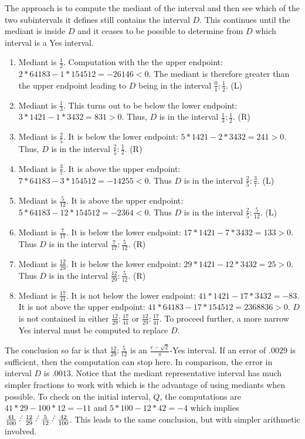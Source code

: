 \documentclass[12pt]{article}
\begin{document}
The approach is to compute the mediant of the interval and then see which of the two subintervals it defines still contains the interval $D$. This continues until the mediant is inside $D$ and it ceases to be possible to determine from $D$ which interval is a Yes interval. 
\begin{enumerate}
\item Mediant is $\frac{1}{2}$. Computation with the the upper endpoint:  $2*64183 - 1*154512 = -26146 < 0$. The mediant is therefore greater than the upper endpoint leading to $D$ being in the interval $\frac{0}{1}: \frac{1}{2}$. (L)
\item Mediant is $\frac{1}{3}$. This turns out to be below the lower endpoint:  $3*1421 - 1*3432 = 831>0$. Thus, $D$ is in the interval $\frac{1}{3}: \frac{1}{2}$. (R)
\item Mediant is $\frac{2}{5}$. It is below the lower endpoint: $5*1421 - 2*3432 = 241 > 0$. Thus, $D$ is in the interval $\frac{2}{5}: \frac{1}{2}$. (R)
\item Mediant is $\frac{3}{7}$. It is above the upper endpoint: $7*64183- 3*154512 = -14255 < 0$. Thus $D$ is in the interval $\frac{2}{5}: \frac{3}{7}$. (L)
\item Mediant is $\frac{5}{12}$. It is above the upper endpoint: $5*64183 - 12*154512 = -2364 < 0$. Thus $D$ is in the interval $\frac{2}{5}: \frac{5}{12}$. (L)
\item Mediant is $\frac{7}{17}$. It is below the lower endpoint: $17*1421 - 7*3432 = 133 > 0$. Thus $D$ is in the interval $\frac{7}{17}: \frac{5}{12}$. (R)
\item Mediant is $\frac{12}{29}$. It is below the lower endpoint: $29*1421 - 12*3432 = 25 > 0$. Thus $D$ is in the interval $\frac{12}{29}: \frac{5}{12}$. (R)
\item Mediant is $\frac{17}{41}$. It is not below the lower endpoint: $41*1421-17*3432 = -83$. It is not above the upper endpoint: $41*64183-17*154512 = 2368836 >0$. $D$ is not contained in either $\frac{12}{29}: \frac{17}{41}$ or $\frac{12}{29}:\frac{17}{41}$. To proceed further, a more narrow Yes interval must be computed to replace $D$. 
\end{enumerate}
The conclusion so far is that $\frac{12}{29}: \frac{5}{12}$ is an $\frac{e-\sqrt{2}}{\pi}$-Yes interval. If an error of $.0029$ is sufficient, then the computation can stop here. In comparison, the error in interval $D$ is $.0013$. Notice that the mediant representative interval has much simpler fractions to work with which is the advantage of using mediants when possible. To check on the initial interval, $Q$, the computations are $41*29 - 100*12 = -11$ and $5*100-12*42 = -4$ which implies $\frac{41}{100}\lte \frac{12}{29} \lte  \frac{5}{12}\lte \frac{42}{100}$. This leads to the same conclusion, but with simpler arithmetic involved. 
\end{document}
